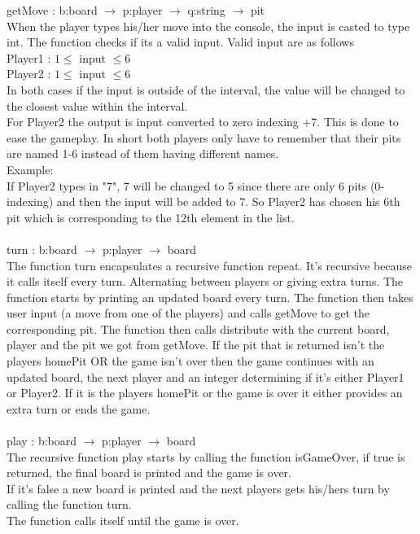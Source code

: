 \documentclass{article}
\begin{document}
getMove : b:board $\rightarrow$ p:player $\rightarrow$ q:string $\rightarrow$ pit\\
When the player types his/her move into the console, the input is casted to type int. The function checks if its a valid input. Valid input are as follows\\
Player1 : $1 \leq \text{ input } \leq 6$\\
Player2 : $1 \leq \text{ input } \leq 6$\\
In both cases if the input is outside of the interval, the value will be changed to the closest value within the interval.\\
For Player2 the output is input converted to zero indexing +7. This is done to ease the gameplay. In short both players only have to remember that their pits are named 1-6 instead of them having different names.\\
Example:\\
If Player2 types in "7", 7 will be changed to 5 since there are only 6 pits (0-indexing) and then the input will be added to 7. So Player2 has chosen his 6th pit which is corresponding to the 12th element in the list.\\
\\
turn : b:board $\rightarrow$ p:player $\rightarrow$ board\\
The function turn encapsulates a recursive function repeat. It's recursive because it calls itself every turn. Alternating between players or giving extra turns. The function starts by printing an updated board every turn. The function then takes user input (a move from one of the players) and calls getMove to get the corresponding pit. The function then calls distribute with the current board, player and the pit we got from getMove. If the pit that is returned isn't the players homePit OR the game isn't over then the game continues  with an updated board, the next player and an integer determining if it's either Player1 or Player2. If it is the players homePit or the game is over it either provides an extra turn or ends the game.\\
\\
play : b:board $\rightarrow$ p:player $\rightarrow$ board\\
The recursive function play starts by calling the function isGameOver, if true is returned, the final board is printed and the game is over.\\
If it's false a new board is printed and the next players gets his/hers turn by calling the function turn.\\
The function calls itself until the game is over.
\end{document}
